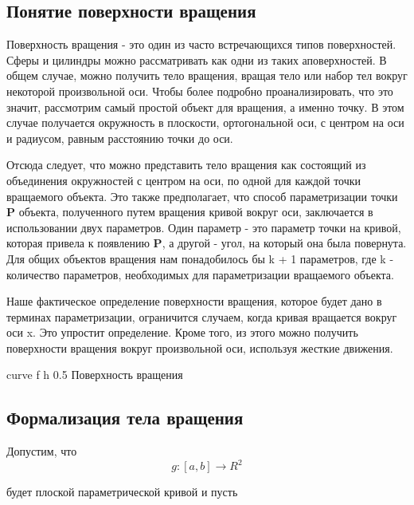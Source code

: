 \subsection{Понятие поверхности вращения}

Поверхность вращения - это один из часто встречающихся типов поверхностей.
Сферы и цилиндры можно рассматривать как одни из таких аповерхностей.
В общем случае, можно получить тело вращения, вращая тело или набор тел вокруг некоторой произвольной оси.
Чтобы более подробно проанализировать, что это значит, рассмотрим самый простой объект для вращения, а именно точку.
В этом случае получается окружность в плоскости, ортогональной оси, с центром на оси и радиусом,
равным расстоянию точки до оси.\newline

Отсюда следует, что можно представить тело вращения как состоящий из объединения окружностей с центром на оси,
по одной для каждой точки вращаемого объекта.
Это также предполагает, что способ параметризации точки \textbf{P} объекта,
полученного путем вращения кривой вокруг оси, заключается в использовании двух параметров.
Один параметр - это параметр точки на кривой, которая привела к появлению \textbf{P},
а другой - угол, на который она была повернута.
Для общих объектов вращения нам понадобилось бы k + 1 параметров, где k - количество параметров,
необходимых для параметризации вращаемого объекта.

Наше фактическое определение поверхности вращения, которое будет дано в терминах параметризации,
ограничится случаем, когда кривая вращается вокруг оси x.
Это упростит определение. Кроме того, из этого можно получить поверхности вращения вокруг произвольной оси,
используя жесткие движения.

{curve} %
{f} %
{h} %
{0.5\textwidth} %
{Поверхность вращения} %

\subsection{Формализация тела вращения}

Допустим, что
\begin{equation}
g: [a, b] \longrightarrow R^2
\end{equation}

будет плоской параметрической кривой и пусть

